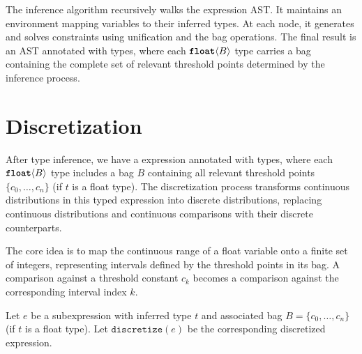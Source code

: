 \documentclass[acmsmall,screen,dvipsnames,x11names,nonacm,anonymous,review]{acmart}
\newcommand{\float}{\text{\ttfamily\bfseries float}}
\newcommand{\Slice}{\text{\scshape Slice}\xspace}
\begin{document}
The inference algorithm recursively walks the expression AST. It maintains an environment mapping variables to their inferred types. At each node, it generates and solves constraints using unification and the bag operations. The final result is an AST annotated with types, where each $\float\langle B \rangle$ type carries a bag containing the complete set of relevant threshold points determined by the inference process.

\section{Discretization}\label{sec:discretization}

After type inference, we have a \Slice expression annotated with types, where each $\float\langle B \rangle$ type includes a bag $B$ containing all relevant threshold points $\{c_0, \dots, c_n\}$ (if $t$ is a float type). The discretization process transforms continuous distributions in this typed expression into discrete distributions, replacing continuous distributions and continuous comparisons with their discrete counterparts.

The core idea is to map the continuous range of a float variable onto a finite set of integers, representing intervals defined by the threshold points in its bag. A comparison against a threshold constant $c_k$ becomes a comparison against the corresponding interval index $k$.

Let $e$ be a subexpression with inferred type $t$ and associated bag $B = \{c_0, \dots, c_n\}$ (if $t$ is a float type). Let $\texttt{discretize}(e)$ be the corresponding discretized expression.
\end{document}
